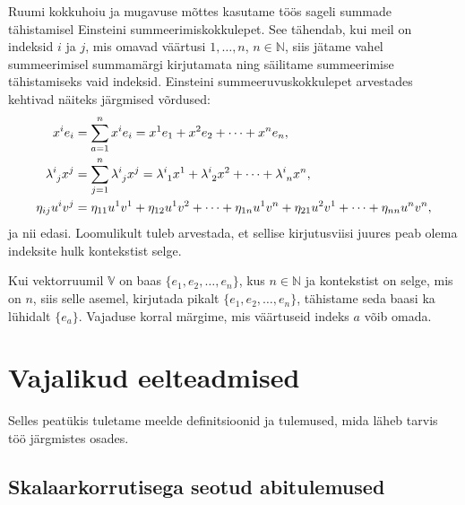 \documentclass[12pt]{article}
\theoremstyle{plain}
\theoremstyle{definition}
\numberwithin{equation}{section}
\def\N{{\mathbb N}}
\def\V{{\mathbb V}}
\begin{document}
Ruumi kokkuhoiu ja mugavuse mõttes kasutame töös sageli 
summade tähista\-misel Einsteini summeerimiskokkulepet. 
See tähendab, kui meil on indeksid $i$ 
ja $j$, mis omavad väärtusi $1, \dots, n$, $n \in \N$, siis 
jätame vahel summeerimisel summamärgi kirjutamata 
ning säilitame summeerimise tähistamiseks vaid indeksid. 
Einsteini summeeruvuskokkulepet arvestades kehtivad näiteks 
järgmised võrdused:
\begin{align*}
x^{i} e_{i} &= \sum_{a=1}^{n} x^{i} e_{i} = 
	x^{1} e_{1} + x^{2} e_{2} + \dots + x^{n} e_{n}, \\
\lambda\indices{^i_j} x^{j} &= \sum_{j=1}^{n} 
	\lambda\indices{^i_j} x^{j} = \lambda\indices{^i_1} x^{1} + 
	\lambda\indices{^i_2} x^{2} + 
	\dots +\lambda\indices{^i_n} x^{n},\\
\eta_{ij} u^{i} v^{j} &= \eta_{11} u^{1} v^{1} + 
	\eta_{12} u^{1} v^{2} + \dots + \eta_{1n} u^{1} v^{n} + 
	\eta_{21} u^{2} v^{1} + \dots + \eta_{nn} u^{n} v^{n},
\end{align*}
ja nii edasi. Loomulikult tuleb arvestada, et sellise 
kirjutusviisi juures peab olema indeksite hulk kontekstist 
selge.

Kui vektorruumil $\V$ on baas $\{e_1, e_2, \ldots, e_n\}$, kus 
$n \in \N$ ja kontekstist on selge, mis on $n$, siis selle 
asemel, kirjutada pikalt $\{e_1, e_2, \ldots, e_n\}$, tähistame 
seda baasi ka lühidalt $\{e_a\}$. Vajaduse korral märgime, mis 
väärtuseid indeks $a$ võib omada.

\newpage
\section{Vajalikud eelteadmised}

Selles peatükis tuletame meelde definitsioonid ja tulemused, mida 
läheb tarvis töö järgmistes osades.

\subsection{Skalaarkorrutisega seotud abitulemused}
\label{eelteadmised:skalaar}
\end{document}
